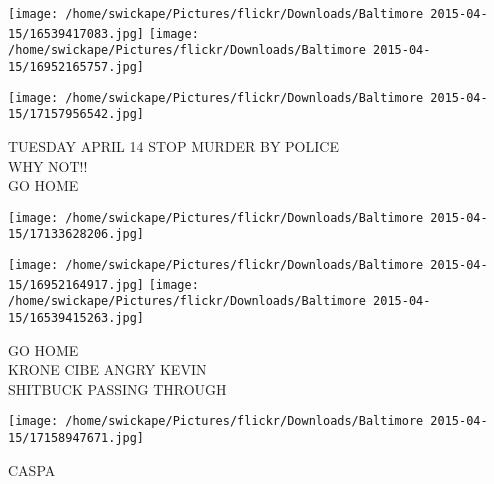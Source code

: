 \documentclass[10pt,letterpaper]{article}
\begin{document}
\texttt{[image: /home/swickape/Pictures/flickr/Downloads/Baltimore 2015-04-15/16539417083.jpg]}
\texttt{[image: /home/swickape/Pictures/flickr/Downloads/Baltimore 2015-04-15/16952165757.jpg]}

\texttt{[image: /home/swickape/Pictures/flickr/Downloads/Baltimore 2015-04-15/17157956542.jpg]}

TUESDAY APRIL 14 STOP MURDER BY POLICE\\
WHY NOT!!\\
GO HOME
\pagebreak

\texttt{[image: /home/swickape/Pictures/flickr/Downloads/Baltimore 2015-04-15/17133628206.jpg]}

\vspace{0.25in}
\texttt{[image: /home/swickape/Pictures/flickr/Downloads/Baltimore 2015-04-15/16952164917.jpg]}
\texttt{[image: /home/swickape/Pictures/flickr/Downloads/Baltimore 2015-04-15/16539415263.jpg]}

GO HOME\\
KRONE CIBE ANGRY KEVIN\\
SHITBUCK PASSING THROUGH
\pagebreak

\texttt{[image: /home/swickape/Pictures/flickr/Downloads/Baltimore 2015-04-15/17158947671.jpg]}

CASPA
\pagebreak
\end{document}
